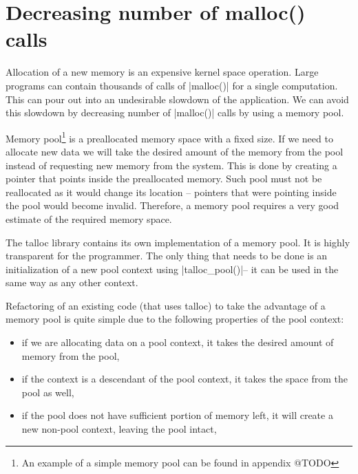 \section{Decreasing number of malloc() calls}
\label{talloc:pool}

Allocation of a new memory is an expensive kernel space operation. Large
programs can contain thousands of calls of |malloc()| for a single computation.
This can pour out into an undesirable slowdown of the application. We can avoid
this slowdown by decreasing number of |malloc()| calls by using a memory pool.

Memory pool\footnote{An example of a simple memory pool can be found in appendix
@TODO} is a preallocated memory space with a fixed size. If we need to allocate
new data we will take the desired amount of the memory from the pool instead of
requesting new memory from the system. This is done by creating a pointer that
points inside the preallocated memory. Such pool must not be reallocated as it
would change its location -- pointers that were pointing inside the pool would
become invalid. Therefore, a memory pool requires a very good estimate of the
required memory space.

The talloc library contains its own implementation of a memory pool. It is
highly transparent for the programmer. The only thing that needs to be done is
an initialization of a new pool context using |talloc_pool()|\footnotemark --
it can be used in the same way as any other context.


Refactoring of an existing code (that uses talloc) to take the advantage of a
memory pool is quite simple due to the following properties of the pool context:

\begin{itemize}
  \item if we are allocating data on a pool context, it takes the desired
  amount of memory from the pool,
  \item if the context is a descendant of the pool context, it takes the space
  from the pool as well,
  \item if the pool does not have sufficient portion of memory left, it will
  create a new non-pool context, leaving the pool intact,
\end{itemize}

